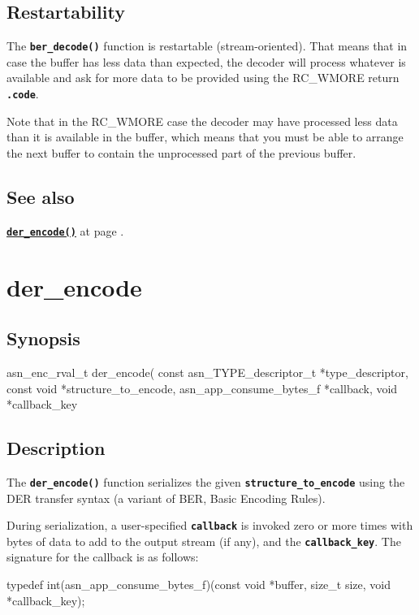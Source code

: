 \documentclass[english,oneside,12pt]{book}
\newcommand{\apisection}[2]{\clearpage\section{\label{#1}#2}}
\newcommand{\api}[2]{\hyperref[#1]{\code{#2}}}
\newcommand{\seealso}[2]{\api{#1}{#2} at page \pageref{#1}}
\newcommand{\code}[1]{\texttt{\textbf{\lstinline{#1}}}}
\begin{document}
\subsection*{Restartability}

The \code{ber_decode()} function is restartable (stream-oriented).
That means that in case the buffer has less data than expected,
the decoder will process whatever is available and ask for more data
to be provided using the RC\_WMORE return \code{.code}.

Note that in the RC\_WMORE case the decoder may have processed less data than
it is available in the buffer, which means that you must be able to arrange
the next buffer to contain the unprocessed part of the previous buffer.

\subsection*{See also}
\seealso{sec:der_encode}{der_encode()}.

\apisection{sec:der_encode}{der\_encode}

\subsection*{Synopsis}

\begin{signature}
asn_enc_rval_t der_encode(
    const asn_TYPE_descriptor_t *type_descriptor,
    const void *structure_to_encode,
    asn_app_consume_bytes_f *callback,
    void *callback_key
\end{signature}

\subsection*{Description}

The \code{der_encode()} function serializes the given \code{structure_to_encode} using the DER transfer syntax (a variant of BER, Basic Encoding Rules).

During serialization, a user-specified \code{callback} is invoked zero
or more times with bytes of data to add to the output stream (if any), and
the \code{callback_key}. The signature for the callback is as follows:

\begin{signature}
typedef int(asn_app_consume_bytes_f)(const void *buffer, size_t size, void *callback_key);
\end{signature}
\end{document}
